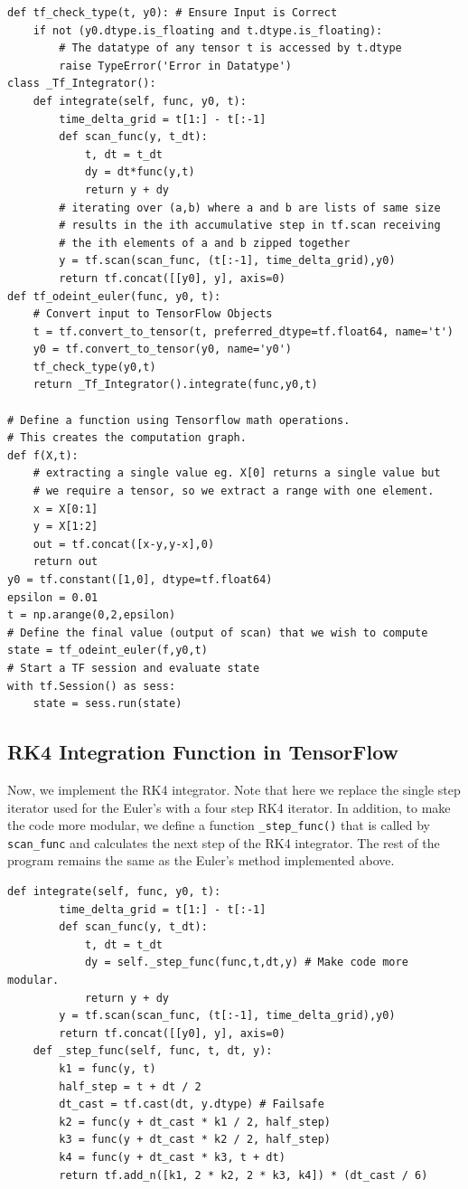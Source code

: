 \documentclass[10pt,letterpaper]{article}
\begin{document}
\begin{verbatim}
def tf_check_type(t, y0): # Ensure Input is Correct
    if not (y0.dtype.is_floating and t.dtype.is_floating): 
        # The datatype of any tensor t is accessed by t.dtype
        raise TypeError('Error in Datatype')
class _Tf_Integrator():
    def integrate(self, func, y0, t): 
        time_delta_grid = t[1:] - t[:-1]  
        def scan_func(y, t_dt): 
            t, dt = t_dt
            dy = dt*func(y,t)
            return y + dy
        # iterating over (a,b) where a and b are lists of same size
        # results in the ith accumulative step in tf.scan receiving
        # the ith elements of a and b zipped together
        y = tf.scan(scan_func, (t[:-1], time_delta_grid),y0) 
        return tf.concat([[y0], y], axis=0)
def tf_odeint_euler(func, y0, t):
    # Convert input to TensorFlow Objects
    t = tf.convert_to_tensor(t, preferred_dtype=tf.float64, name='t')
    y0 = tf.convert_to_tensor(y0, name='y0')
    tf_check_type(y0,t)
    return _Tf_Integrator().integrate(func,y0,t)
    
# Define a function using Tensorflow math operations. 
# This creates the computation graph.
def f(X,t):
    # extracting a single value eg. X[0] returns a single value but
    # we require a tensor, so we extract a range with one element.
    x = X[0:1] 
    y = X[1:2]
    out = tf.concat([x-y,y-x],0)
    return out
y0 = tf.constant([1,0], dtype=tf.float64)
epsilon = 0.01
t = np.arange(0,2,epsilon)
# Define the final value (output of scan) that we wish to compute
state = tf_odeint_euler(f,y0,t)
# Start a TF session and evaluate state
with tf.Session() as sess:
    state = sess.run(state)
\end{verbatim}

\subsection*{RK4 Integration Function in TensorFlow}

Now, we implement the RK4 integrator. Note that here we replace the single step iterator used for the Euler's with a four step RK4 iterator. In addition, to make the code more modular, we define a function \texttt{\_step\_func()} that is called by \texttt{scan\_func} and calculates the next step of the RK4 integrator. The rest of the program remains the same as the Euler's method implemented above.

\begin{verbatim}
def integrate(self, func, y0, t): 
        time_delta_grid = t[1:] - t[:-1]
        def scan_func(y, t_dt): 
            t, dt = t_dt
            dy = self._step_func(func,t,dt,y) # Make code more modular.
            return y + dy
        y = tf.scan(scan_func, (t[:-1], time_delta_grid),y0)
        return tf.concat([[y0], y], axis=0)
    def _step_func(self, func, t, dt, y):
        k1 = func(y, t)
        half_step = t + dt / 2
        dt_cast = tf.cast(dt, y.dtype) # Failsafe
        k2 = func(y + dt_cast * k1 / 2, half_step)
        k3 = func(y + dt_cast * k2 / 2, half_step)
        k4 = func(y + dt_cast * k3, t + dt)
        return tf.add_n([k1, 2 * k2, 2 * k3, k4]) * (dt_cast / 6)
\end{verbatim}
\end{document}
